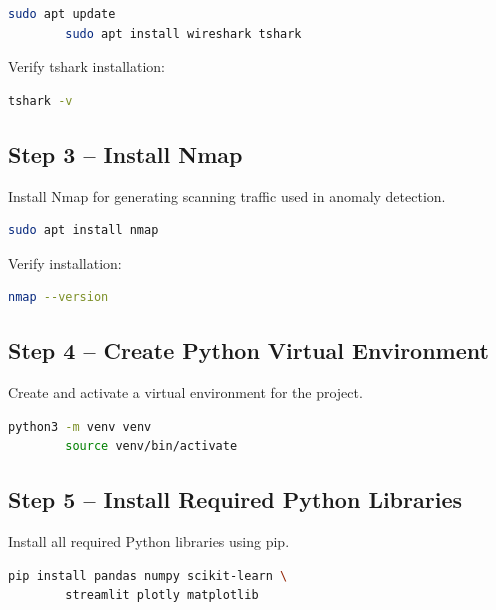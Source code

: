 \documentclass[12pt,a4paper]{article}
\begin{document}
	\begin{lstlisting}[language=bash]
		sudo apt update
		sudo apt install wireshark tshark
	\end{lstlisting}
	
	Verify tshark installation:
	
	\begin{lstlisting}[language=bash]
		tshark -v
	\end{lstlisting}
	
	\vspace{0.5cm}
	
	\subsection*{Step 3 -- Install Nmap}
	
	Install Nmap for generating scanning traffic used in anomaly detection.
	
	\begin{lstlisting}[language=bash]
		sudo apt install nmap
	\end{lstlisting}
	
	Verify installation:
	
	\begin{lstlisting}[language=bash]
		nmap --version
	\end{lstlisting}
	
	\vspace{0.5cm}
	
	\subsection*{Step 4 -- Create Python Virtual Environment}
	
	Create and activate a virtual environment for the project.
	
	\begin{lstlisting}[language=bash]
		python3 -m venv venv
		source venv/bin/activate
	\end{lstlisting}
	
	\vspace{0.5cm}
	
	\subsection*{Step 5 -- Install Required Python Libraries}
	
	Install all required Python libraries using pip.
	
	\begin{lstlisting}[language=bash]
		pip install pandas numpy scikit-learn \
		streamlit plotly matplotlib
	\end{lstlisting}
	
\end{document}
